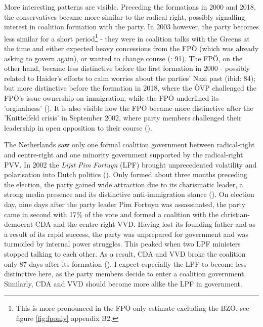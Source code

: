 \documentclass{article}
\begin{document}
More interesting patterns are visible. Preceding the formations in 2000 and 2018, the conservatives became more similar to the radical-right, possibly signalling interest in coalition formation with the party. In 2003 however, the party becomes less similar for a short period\footnote{This is more pronounced in the FPÖ-only estimate excluding the BZÖ, see figure \ref{fig:fponly} appendix B2.} - they were in coalition talks with the Greens at the time and either expected heavy concessions from the FPÖ (which was already asking to govern again), or wanted to change course (\cite{Luther2010}: 91). The FPÖ, on the other hand, became less distinctive before the first formation in 2000 - possibly related to Haider's efforts to calm worries about the parties' Nazi past (ibid: 84); but more distinctive before the formation in 2018, where the ÖVP challenged the FPÖ's issue ownership on immigration, while the FPÖ underlined its 'orginalness' (\cite{Bodlos2018}). It is also visible how the FPÖ became more distinctive after the 'Knittelfeld crisis' in September 2002, where party members challenged their leadership in open opposition to their course (\cite{Luther2002}). \par

The Netherlands saw only one formal coalition government between radical-right and centre-right and one minority government supported by the radical-right PVV. In 2002 the \textit{Lijst Pim Fortuyn} (LPF) brought unprecedented volatility and polarisation into Dutch politics (\cite{Bischof2019a, VanderBrug2003}). Only formed about three months preceding the election, the party gained wide attraction due to its charismatic leader, a strong media presence and its distinctive anti-immigration stance (\cite{Koopmans2009}). On election day, nine days after the party leader Pim Fortuyn was assassinated, the party came in second with 17\% of the vote and formed a coalition with the christian-democrat CDA and the centre-right VVD. Having lost its founding father and as a result of its rapid success, the party was unprepared for government and was turmoiled by internal power struggles. This peaked when two LPF ministers stopped talking to each other. As a result, CDA and VVD broke the coalition only 87 days after its formation (\cite{Heinisch2003, Lucardie2007LPF}). I expect especially the LPF to become less distinctive here, as the party members decide to enter a coalition government. Similarly, CDA and VVD should become more alike the LPF in government.\par
\end{document}
